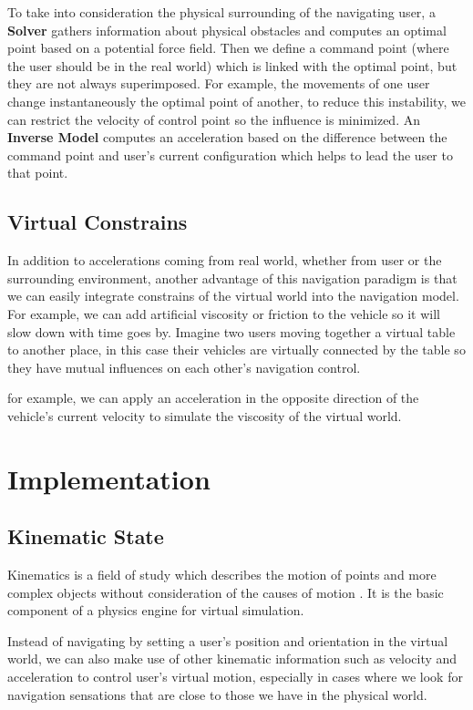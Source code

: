 To take into consideration the physical surrounding of the navigating user, a \textbf{Solver} gathers information about physical obstacles and computes an optimal point based on a potential force field. Then we define a command point (where the user should be in the real world) which is linked with the optimal point, but they are not always superimposed. For example, the movements of one user change instantaneously the optimal point of another, to reduce this instability, we can restrict the velocity of control point so the influence is minimized. An \textbf{Inverse Model} computes an acceleration based on the difference between the command point and user's current configuration which helps to lead the user to that point.

\subsection{Virtual Constrains}
In addition to accelerations coming from real world, whether from user or the surrounding environment, another advantage of this navigation paradigm is that we can easily integrate constrains of the virtual world into the navigation model. For example, we can add artificial viscosity or friction to the vehicle so it will slow down with time goes by. Imagine two users moving together a virtual table to another place, in this case their vehicles are virtually connected by the table so they have mutual influences on each other's navigation control.

for example, we can apply an acceleration in the opposite direction of the vehicle's current velocity to simulate the viscosity of the virtual world. 




\section{Implementation}
\subsection{Kinematic State}
Kinematics is a field of study which describes the motion of points and more complex objects without consideration of the causes of motion \citep{Beggs1983Kinematics}. It is the basic component of a physics engine for virtual simulation.

Instead of navigating by setting a user's position and orientation in the virtual world, we can also make use of other kinematic information such as velocity and acceleration to control user's virtual motion, especially in cases where we look for navigation sensations that are close to those we have in the physical world. 

